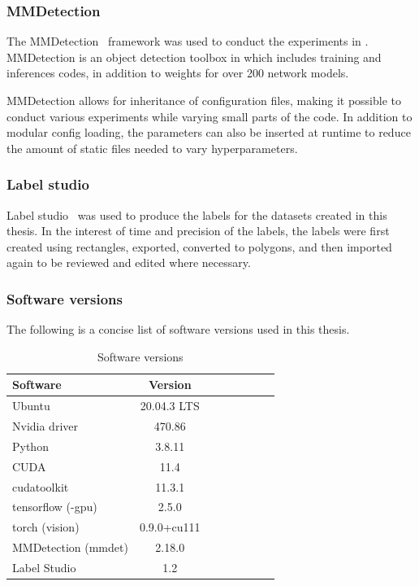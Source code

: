 \documentclass[oneside, english, bibtex]{kththesis}
\begin{document}
\subsubsection{MMDetection}
The MMDetection~\cite{DBLP:journals/corr/abs-1906-07155} framework was used to conduct the experiments in .
MMDetection is an object detection toolbox in which includes training and inferences codes, in addition to weights for over 200 network models.

MMDetection allows for inheritance of configuration files, making it possible to conduct various experiments while varying small parts of the code.
In addition to modular config loading, the parameters can also be inserted at runtime to reduce the amount of static files needed to vary hyperparameters.

\subsubsection{Label studio}
Label studio~\cite{Label_Studio} was used to produce the labels for the datasets created in this thesis. In the interest of time and precision of the labels, the labels were first created using rectangles, exported, converted to polygons, and then imported again to be reviewed and edited where necessary. 

\subsubsection{Software versions}

The following is a concise list of software versions used in this thesis.

\begin{table}[!ht]
  \begin{center}
    \caption{Software versions}
        \begin{tabular}{l*{6}{c}r}
        \label{tab:softwareversions}
        \textbf{Software} & \textbf{Version} \\
        \hline
        Ubuntu & 20.04.3 LTS & \\
        Nvidia driver     & 470.86 & \\
        Python           & 3.8.11 & \\
        CUDA     & 11.4 & \\
        cudatoolkit     & 11.3.1 & \\
        tensorflow (-gpu)     & 2.5.0 & \\
        torch (vision)     & 0.9.0+cu111 & \\
        MMDetection (mmdet)     & 2.18.0 & \\
        Label Studio     & 1.2 & \\
        \end{tabular}
  \end{center}
\end{table}
\end{document}
